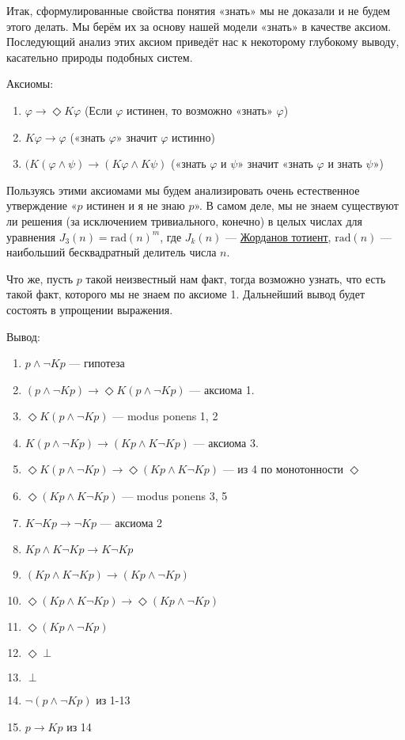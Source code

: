 \documentclass[openany]{book}
\theoremstyle{plain}
\theoremstyle{definition}
\begin{document}
Итак, сформулированные свойства понятия «знать» мы не доказали и не будем этого делать. Мы берём их за основу нашей модели «знать» в качестве аксиом. Последующий анализ этих аксиом приведёт нас к некоторому глубокому выводу, касательно природы подобных систем.

Аксиомы:
\begin{enumerate}
\item \(\varphi \to \Diamond K \varphi\) (Если \(\varphi\) истинен, то возможно «знать» \(\varphi\))
\item \(K\varphi \to \varphi\) («знать \(\varphi\)» значит \(\varphi\) истинно)
\item \((K(\varphi \land \psi) \to (K\varphi \land K\psi)\) («знать \(\varphi\) и \(\psi\)» значит «знать \(\varphi\) и знать \(\psi\)»)
\end{enumerate}

Пользуясь этими аксиомами мы будем анализировать очень естественное утверждение «\(p\) истинен и я не знаю \(p\)». В самом деле, мы не знаем существуют ли решения (за исключением тривиального, конечно) в целых числах для уравнения \(J_3(n) = \mathrm{rad}(n)^m\), где \(J_k(n)\) — \href{https://ru.wikipedia.org/wiki/Жорданов_тотиент}{Жорданов тотиент}, \(\mathrm{rad}(n)\) — наибольший бесквадратный делитель числа \(n\).

Что же, пусть \(p\) такой неизвестный нам факт, тогда возможно узнать, что есть такой факт, которого мы не знаем по аксиоме 1. Дальнейший вывод будет состоять в упрощении выражения.

Вывод:
\begin{enumerate}
\item \(p \land \neg Kp\) — гипотеза
\item \((p \land \neg Kp) \to \Diamond K (p \land \neg K p)\) — аксиома 1.
\item \(\Diamond K(p \land \neg K p)\) — modus ponens 1, 2
\item \(K(p \land \neg Kp) \to (Kp \land K \neg Kp)\) — аксиома 3.
\item \(\Diamond K(p \land \neg K p) \to \Diamond (Kp \land K\neg Kp)\) — из 4 по монотонности \(\Diamond\)
\item \(\Diamond(K p \land K \neg Kp)\) — modus ponens 3, 5
\item \(K \neg Kp \to \neg Kp\) — аксиома 2
\item \(Kp \land K \neg Kp \to K \neg Kp\)
\item \((Kp \land K \neg Kp) \to (Kp \land \neg Kp)\)
\item \(\Diamond (Kp \land K\neg Kp) \to \Diamond(Kp \land \neg Kp)\)
\item \(\Diamond (Kp \land \neg Kp)\)
\item \(\Diamond \perp\)
\item \(\perp\)
\item \(\neg (p \land \neg Kp)\) из 1-13
\item \(p \to Kp\) из 14
\end{enumerate}
\end{document}
